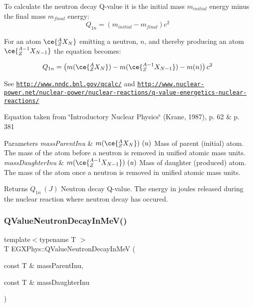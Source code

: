 To calculate the neutron decay Q-\/value it is the initial mass $m_{initial}$ energy minus the final mass $m_{final}$ energy\+: \[Q_{1n} = \left ( m_{initial}-m_{final}\right ) c^2\]

For an atom $\ce{ ^{A}_{Z}X_{N} }$ emitting a neutron, $n$, and thereby producing an atom $\ce{ ^{A-1}_{Z}X_{N-1} }$ the equation becomes\+:

\[Q_{1n} = \left ( m(\ce{ ^{A}_{Z}X_{N} }) - m(\ce{ ^{A-1}_{Z}X_{N-1} }) - m(n) \right ) c^2\]

See \href{http://www.nndc.bnl.gov/qcalc/}{\tt http\+://www.\+nndc.\+bnl.\+gov/qcalc/} and \href{http://www.nuclear-power.net/nuclear-power/nuclear-reactions/q-value-energetics-nuclear-reactions/}{\tt http\+://www.\+nuclear-\/power.\+net/nuclear-\/power/nuclear-\/reactions/q-\/value-\/energetics-\/nuclear-\/reactions/}

Equation taken from \char`\"{}\+Introductory Nuclear Physics\char`\"{} (Krane, 1987), p. 62 \& p. 381


\begin{DoxyParams}{Parameters}
{\em mass\+Parent\+Inu} & $m(\ce{ ^{A}_{Z}X_{N} })\ (u)$ Mass of parent (initial) atom. The mass of the atom before a neutron is removed in unified atomic mass units. \\
\hline
{\em mass\+Daughter\+Inu} & $m(\ce{ ^{A-1}_{Z}X_{N-1} })\ (u)$ Mass of daughter (produced) atom. The mass of the atom once a neutron is removed in unified atomic mass units. \\
\hline
\end{DoxyParams}
\begin{DoxyReturn}{Returns}
$Q_{1n}\ (J)$ Neutron decay Q-\/value. The energy in joules released during the nuclear reaction where neutron decay has occured. 
\end{DoxyReturn}
\mbox{\label{group___e_g_x_phys-_q_value_gaf854b3ac07909a87f44be4e38ebb0c32}} 
\subsubsection{\texorpdfstring{Q\+Value\+Neutron\+Decay\+In\+Me\+V()}{QValueNeutronDecayInMeV()}}
{\footnotesize\ttfamily template$<$typename T $>$ \\
T E\+G\+X\+Phys\+::\+Q\+Value\+Neutron\+Decay\+In\+MeV (\begin{DoxyParamCaption}\item[{const T \&}]{mass\+Parent\+Inu,  }\item[{const T \&}]{mass\+Daughter\+Inu }\end{DoxyParamCaption})}



